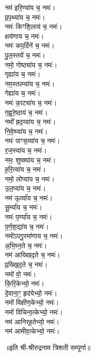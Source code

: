 \begin{multicols}{2}
\begin{flushleft}
नम॑ इरि॒ण्या॑य च॒ नमः॑।\\
प्र॒प॒थ्या॑य च॒ नमः॑।\\
नमः॑ किꣳशि॒लाय॑ च॒ नमः॑।\\
क्षय॑णाय च॒ नमः॑।\\
नमः॑ कप॒र्दिने॑ च॒ नमः॑।\hfill {}\\
पु॒ल॒स्तये॑ च॒ नमः॑।\\
नमो॒ गोष्ठ्या॑य च॒ नमः॑।\\
गृह्या॑य च॒ नमः॑।\\
नम॒स्तल्प्या॑य च॒ नमः॑।\\
गेह्या॑य च॒ नमः॑।\\
नमः॑ का॒ट्या॑य च॒ नमः॑।\\
ग॒ह्व॒रे॒ष्ठाय॑ च॒ नमः॑।\\
नमो᳚ ह्रद॒य्या॑य च॒ नमः॑।\\
नि॒वे॒ष्प्या॑य च॒ नमः॑।\\
नमः॑ पाꣳस॒व्या॑य च॒ नमः॑।\hfill {}\\
र॒ज॒स्या॑य च॒ नमः॑।\\
नमः॒ शुष्क्या॑य च॒ नमः॑।\\
ह॒रि॒त्या॑य च॒ नमः॑।\\
नमो॒ लोप्या॑य च॒ नमः॑।\\
उ॒ल॒प्या॑य च॒ नमः॑।\\
नम॑ ऊ॒र्व्या॑य च॒ नमः॑।\\
सू॒र्म्या॑य च॒ नमः॑।\\
नमः॑ प॒र्ण्या॑य च॒ नमः॑।\\
प॒र्ण॒श॒द्या॑य च॒ नमः॑।\\
नमो॑ऽपगु॒रमा॑णाय च॒ नमः॑।\hfill {}\\
अ॒भि॒घ्न॒ते च॒ नमः॑।\\
नम॑ आख्खिद॒ते च॒ नमः॑।\\
प्र॒ख्खि॒द॒ते च॒ नमः॑।\\
नमो॑ वो॒ नमः॑।\\
कि॒रि॒केभ्यो॒ नमः॑।\\
दे॒वाना॒ꣳ॒ हृद॑येभ्यो॒ नमः॑।\\
नमो॑ विक्षीण॒केभ्यो॒ नमः॑।\\
नमो॑ विचिन्व॒त्केभ्यो॒ नमः॑।\\
नम॑ आनिर्‌ह॒तेभ्यो॒ नमः॑।\\
नम॑ आमीव॒त्केभ्यो॒ नमः॑।\hfill {}\\
\end{flushleft}
\end{multicols}
\centerline{॥इति श्री-श्रीरुद्रनाम त्रिशती सम्पूर्णा॥}
